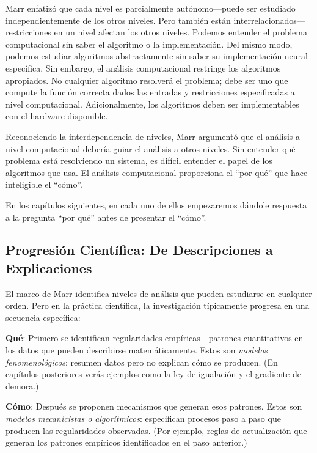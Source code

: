 \documentclass[
  letterpaper,
  DIV=11,
  numbers=noendperiod]{scrreprt}
\begin{document}
Marr enfatizó que cada nivel es parcialmente autónomo---puede ser
estudiado independientemente de los otros niveles. Pero también están
interrelacionados---restricciones en un nivel afectan los otros niveles.
Podemos entender el problema computacional sin saber el algoritmo o la
implementación. Del mismo modo, podemos estudiar algoritmos
abstractamente sin saber su implementación neural específica. Sin
embargo, el análisis computacional restringe los algoritmos apropiados.
No cualquier algoritmo resolverá el problema; debe ser uno que compute
la función correcta dados las entradas y restricciones especificadas a
nivel computacional. Adicionalmente, los algoritmos deben ser
implementables con el hardware disponible.

Reconociendo la interdependencia de niveles, Marr argumentó que el
análisis a nivel computacional debería guiar el análisis a otros
niveles. Sin entender qué problema está resolviendo un sistema, es
difícil entender el papel de los algoritmos que usa. El análisis
computacional proporciona el ``por qué'' que hace inteligible el
``cómo''.

En los capítulos siguientes, en cada uno de ellos empezaremos dándole
respuesta a la pregunta ``por qué'' antes de presentar el ``cómo''.

\subsection{Progresión Científica: De Descripciones a
Explicaciones}\label{progresiuxf3n-cientuxedfica-de-descripciones-a-explicaciones}

El marco de Marr identifica niveles de análisis que pueden estudiarse en
cualquier orden. Pero en la práctica científica, la investigación
típicamente progresa en una secuencia específica:

\textbf{Qué}: Primero se identifican regularidades empíricas---patrones
cuantitativos en los datos que pueden describirse matemáticamente. Estos
son \emph{modelos fenomenológicos}: resumen datos pero no explican cómo
se producen. (En capítulos posteriores verás ejemplos como la ley de
igualación y el gradiente de demora.)

\textbf{Cómo}: Después se proponen mecanismos que generan esos patrones.
Estos son \emph{modelos mecanicistas o algorítmicos}: especifican
procesos paso a paso que producen las regularidades observadas. (Por
ejemplo, reglas de actualización que generan los patrones empíricos
identificados en el paso anterior.)
\end{document}
